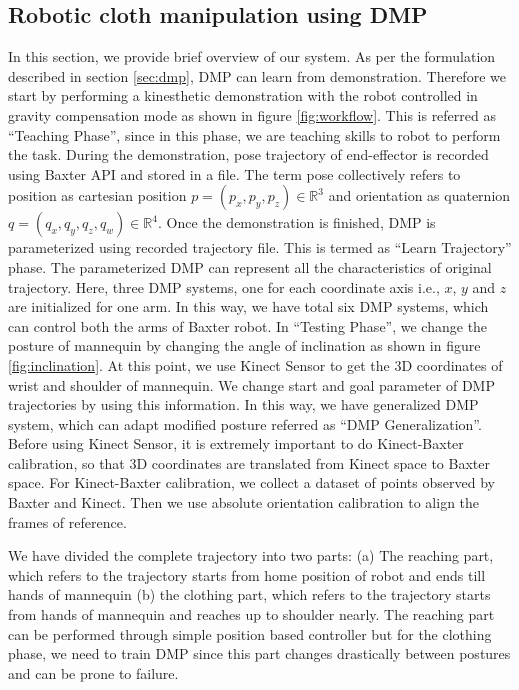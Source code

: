 \documentclass[sigconf]{acmart}
\begin{document}
\subsection{Robotic cloth manipulation using DMP}
\label{sec:system_overview}
In this section, we provide brief overview of our system. As per the formulation described in section \ref{sec:dmp}, DMP can learn from demonstration. Therefore we start by performing a kinesthetic demonstration with the robot controlled in gravity compensation mode as shown in figure \ref{fig:workflow}. This is referred as ``Teaching Phase'', since in this phase, we are teaching skills to robot to perform the task.  During the demonstration, pose trajectory of end-effector is recorded using Baxter API and stored in a file. The term pose collectively refers to position as cartesian position $p = (p_x, p_y, p_z) \in \mathbb{R}^3$ and orientation as quaternion $q = (q_x, q_y, q_z, q_w) \in \mathbb{R}^4$. Once the demonstration is finished, DMP is parameterized using recorded trajectory file. This is termed as ``Learn Trajectory'' phase. The parameterized DMP can represent all the characteristics of original trajectory. Here, three DMP systems, one for each coordinate axis i.e., $x$, $y$ and $z$ are initialized for one arm. In this way, we have total six DMP systems, which can control both the arms of Baxter robot. In ``Testing Phase'', we change the posture of mannequin by changing the angle of inclination as shown in figure \ref{fig:inclination}. At this point, we use Kinect Sensor to get the 3D coordinates of wrist and shoulder of mannequin. We change start and goal parameter of DMP trajectories by using this information. In this way, we have generalized DMP system, which can adapt modified posture referred as ``DMP Generalization''. Before using Kinect Sensor, it is extremely important to do Kinect-Baxter calibration, so that 3D coordinates are translated from Kinect space to Baxter space. For Kinect-Baxter calibration, we collect a dataset of points observed by Baxter and Kinect. Then we use absolute orientation calibration \citep{umeyama1991least} to align the frames of reference.

We have divided the complete trajectory into two parts: (a) The reaching part, which refers to the trajectory starts from home position of robot and ends till hands of mannequin (b) the clothing part, which refers to the trajectory starts from hands of mannequin and reaches up to shoulder nearly. The reaching part can be performed through simple position based controller but for the clothing phase, we need to train DMP since this part changes drastically between postures and can be prone to failure.
\end{document}
